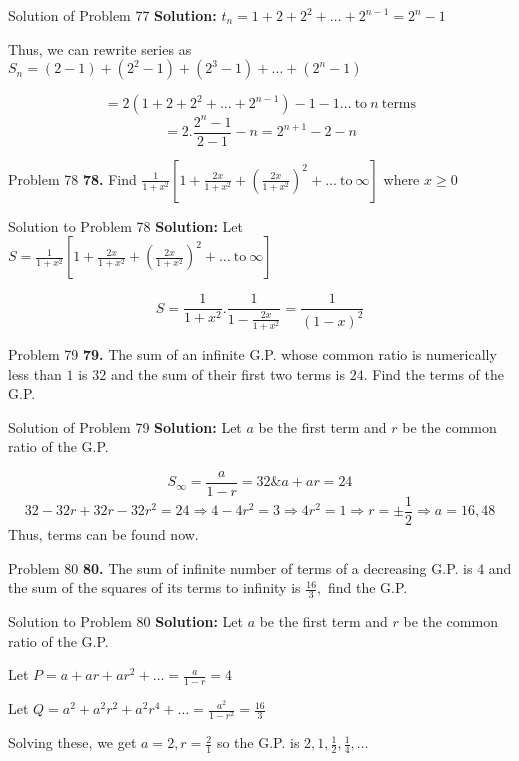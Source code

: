 \documentclass[aspectratio=1610,8pt]{beamer}
\begin{document}
\begin{frame}{Solution of Problem 77}
  \textbf{Solution:} $t_n = 1 + 2 + 2^2 + \ldots + 2^{n - 1} = 2^n - 1$

  Thus, we can rewrite series as $S_n = (2 - 1) + (2^2 - 1) + (2^3 - 1) + \ldots + (2^n - 1)$

  $$= 2(1 + 2 + 2^2 + \ldots + 2^{n - 1}) - 1 - 1 \ldots~\text{to}~n~\text{terms}$$
  $$= 2.\frac{2^n - 1}{2 - 1} - n = 2^{n + 1} - 2 - n$$
\end{frame}
\begin{frame}{Problem 78}
  \textbf{78.} Find $\frac{1}{1 + x^2}\left[1 + \frac{2x}{1 + x^2} + \left(\frac{2x}{1 + x^2}\right)^2 +
    \ldots~\text{to}~\infty\right]$ where $x\geq 0$
\end{frame}
\begin{frame}{Solution to Problem 78}
  \textbf{Solution:} Let $S = \frac{1}{1 + x^2}\left[1 + \frac{2x}{1 + x^2} + \left(\frac{2x}{1 + x^2}\right)^2 +
    \ldots~\text{to}~\infty\right]$

  $$S= \frac{1}{1 + x^2}.\frac{1}{1 - \frac{2x}{1 + x^2}} = \frac{1}{(1 - x)^2}$$
\end{frame}
\begin{frame}{Problem 79}
  \textbf{79.} The sum of an infinite G.P. whose common ratio is numerically less than $1$ is $32$ and the sum of their first two
  terms is $24.$ Find the terms of the G.P.
\end{frame}
\begin{frame}{Solution of Problem 79}
  \textbf{Solution:} Let $a$ be the first term and $r$ be the common ratio of the G.P.

  $$S_\infty = \frac{a}{1 - r} = 32 \& a + ar = 24$$
  $$32 - 32r + 32r - 32r^2 = 24 \Rightarrow 4 - 4r^2 = 3 \Rightarrow 4r^2 = 1\Rightarrow r = \pm\frac{1}{2} \Rightarrow a = 16,
  48$$
  Thus, terms can be found now.
\end{frame}
\begin{frame}{Problem 80}
  \textbf{80.} The sum of infinite number of terms of a decreasing G.P. is $4$ and the sum of the squares of its terms to infinity
  is $\frac{16}{3},$ find the G.P.
\end{frame}
\begin{frame}{Solution to Problem 80}
  \textbf{Solution:} Let $a$ be the first term and $r$ be the common ratio of the G.P.

  Let $P = a + ar + ar^2 + \ldots = \frac{a}{1 - r} = 4$

  Let $Q = a^2 + a^2r^2 + a^2r^4 + \ldots = \frac{a^2}{1 - r^2} = \frac{16}{3}$

  Solving these, we get $a = 2, r= \frac{2}{1}$ so the G.P. is $2, 1, \frac{1}{2}, \frac{1}{4}, \ldots$
\end{frame}
\end{document}
